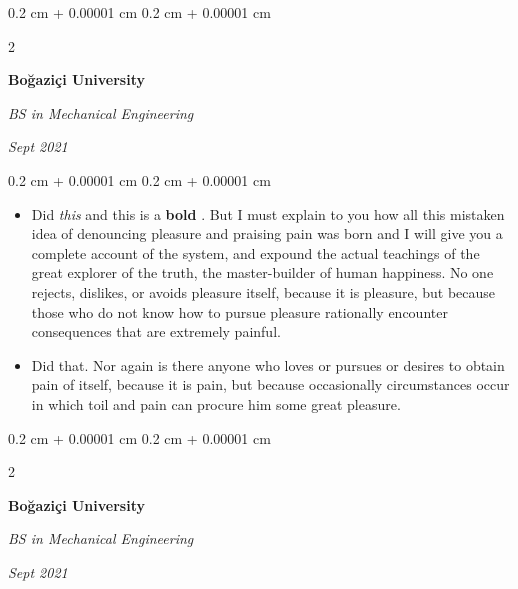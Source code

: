 \documentclass[10pt, letterpaper]{article}
\newenvironment{highlights}{
    \begin{itemize}[
        topsep=0.10 cm,
        parsep=0.10 cm,
        partopsep=0pt,
        itemsep=0pt,
        leftmargin=0.4 cm + 10pt
    ]
}{
    \end{itemize}
} %
\newenvironment{onecolentry}{
    \begin{adjustwidth}{
        0.2 cm + 0.00001 cm
    }{
        0.2 cm + 0.00001 cm
    }
}{
    \end{adjustwidth}
} %
\newenvironment{twocolentry}[2][]{
    \onecolentry
    \def\secondColumn{#2}
    \setcolumnwidth{\fill, 4.5 cm}
    \begin{paracol}{2}
}{
    \switchcolumn \raggedleft \secondColumn
    \end{paracol}
    \endonecolentry
} %
\let\hrefWithoutArrow\href
\renewcommand{\href}[2]{\hrefWithoutArrow{#1}{\ifthenelse{\equal{#2}{}}{ }{#2 }\raisebox{.15ex}{\footnotesize \faExternalLink*}}}
\begin{document}
        \vspace{0.2 cm}

        \begin{twocolentry}{
            
            
        \textit{Sept 2021}}
            \textbf{Boğaziçi University}

            \textit{BS in Mechanical Engineering}
        \end{twocolentry}

        \vspace{0.10 cm}
        \begin{onecolentry}
            \begin{highlights}
                \item Did \textit{this} and this is a \textbf{bold} \href{https://example.com}{link}. But I must explain to you how all this mistaken idea of denouncing pleasure and praising pain was born and I will give you a complete account of the system, and expound the actual teachings of the great explorer of the truth, the master-builder of human happiness. No one rejects, dislikes, or avoids pleasure itself, because it is pleasure, but because those who do not know how to pursue pleasure rationally encounter consequences that are extremely painful.
                \item Did that. Nor again is there anyone who loves or pursues or desires to obtain pain of itself, because it is pain, but because occasionally circumstances occur in which toil and pain can procure him some great pleasure.
            \end{highlights}
        \end{onecolentry}


        \vspace{0.2 cm}

        \begin{twocolentry}{
            
            
        \textit{Sept 2021}}
            \textbf{Boğaziçi University}

            \textit{BS in Mechanical Engineering}
        \end{twocolentry}
\end{document}
